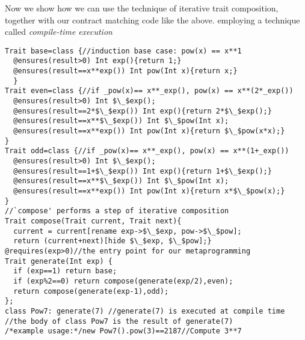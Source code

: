 Now we show how we can use the technique of iterative trait composition, together with our contract matching code like the above.  employing a technique called \emph{compile-time execution}~\cite{sheard2002template}
\vspace{-1ex}
\begin{lstlisting}[firstnumber=11]
Trait base=class {//induction base case: pow(x) == x**1
  @ensures(result>0) Int exp(){return 1;}  
  @ensures(result==x**exp()) Int pow(Int x){return x;}
  }
Trait even=class {//if _pow(x)== x**_exp(), pow(x) == x**(2*_exp())
  @ensures(result>0) Int $\_$exp();
  @ensures(result==2*$\_$exp()) Int exp(){return 2*$\_$exp();}
  @ensures(result==x**$\_$exp()) Int $\_$pow(Int x);
  @ensures(result==x**exp()) Int pow(Int x){return $\_$pow(x*x);}
}
Trait odd=class {//if _pow(x)== x**_exp(), pow(x) == x**(1+_exp())
  @ensures(result>0) Int $\_$exp();
  @ensures(result==1+$\_$exp()) Int exp(){return 1+$\_$exp();}
  @ensures(result==x**$\_$exp()) Int $\_$pow(Int x);
  @ensures(result==x**exp()) Int pow(Int x){return x*$\_$pow(x);}
}
//`compose' performs a step of iterative composition
Trait compose(Trait current, Trait next){
  current = current[rename exp->$\_$exp, pow->$\_$pow];
  return (current+next)[hide $\_$exp, $\_$pow];}
@requires(exp>0)//the entry point for our metaprogramming
Trait generate(Int exp) {
  if (exp==1) return base;
  if (exp%2==0) return compose(generate(exp/2),even);
  return compose(generate(exp-1),odd);
};
class Pow7: generate(7) //generate(7) is executed at compile time
//the body of class Pow7 is the result of generate(7)
/*example usage:*/new Pow7().pow(3)==2187//Compute 3**7
\end{lstlisting}
\vspace{-1ex}